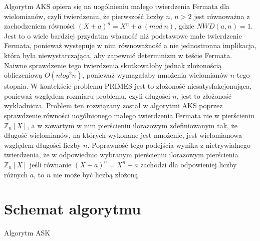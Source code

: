 \documentclass[polish,declaration,shortabstract]{iithesis}
\theoremstyle{definition}
\theoremstyle{remark} \newtheorem{observation}{Obserwacja}
\theoremstyle{plain} \newtheorem{theorem}{Twierdzenie}
\theoremstyle{plain} \newtheorem{lemma}{Lemat}
\theoremstyle{remark} \newtheorem*{remark*}{Uwaga}
\theoremstyle{reminder} \newtheorem*{reminder*}{Przypomnienie}
\begin{document}
Algorytm AKS opiera się na uogólnieniu małego twierdzenia Fermata dla wielomianów, czyli twierdzeniu, że pierwszość liczby $n, \, n > 2$ jest równoważna z zachodzeniem równości $(X + a)^n = X^n + a \: (mod \: n)$, gdzie $NWD(a, n) = 1$. Jest to o wiele bardziej przydatna własność niż podstawowe małe twierdzenie Fermata, ponieważ występuje w nim równoważność a nie jednostronna implikacja, która była niewystarczająca, aby zapewnić determinizm w teście Fermata. Naiwne sprawdzenie tego twierdzenia skutkowałoby jednak złożonością obliczeniową $O(nlog^2n)$, ponieważ wymagałaby mnożenia wielomianów $n$-tego stopnia. W kontekście problemu PRIMES jest to złożoność niesatysfakcjonująca, ponieważ względem rozmiaru problemu, czyli długości $n$, jest to złożoność wykładnicza. Problem ten rozwiązany został w algorytmi AKS poprzez sprawdzenie równości uogólnionego małego twierdzenia Fermata nie w pierścieniu $\mathbb{Z}_n[X]$, a w zawartym w nim pierścieniu ilorazowym zdefiniowanym tak, że długość wielomianów, na których wykonane jest mnożenie, jest wielomianowa względem długości liczby $n$. Poprawność tego podejścia wynika z nietrywialnego twierdzenia, że w odpowiednio wybranym pierścieniu ilorazowym pierścienia $\mathbb{Z}_n[X]$ jeśli równanie $(X + a)^n = X^n + a$ zachodzi dla odpowieniej liczby różnych $a$, to $n$ nie może być liczbą złożoną. 


\section{Schemat algorytmu}
	
\begin{algorithm}
	\caption{Algorytm ASK}
	\begin{algorithmic}[1]
															    
		 
		\EndIf
		 
		 
		\EndIf
		   \EndIf
		 
		 
		\EndIf
		\EndFor
		 
	\end{algorithmic}
\end{algorithm}
	
\end{document}
